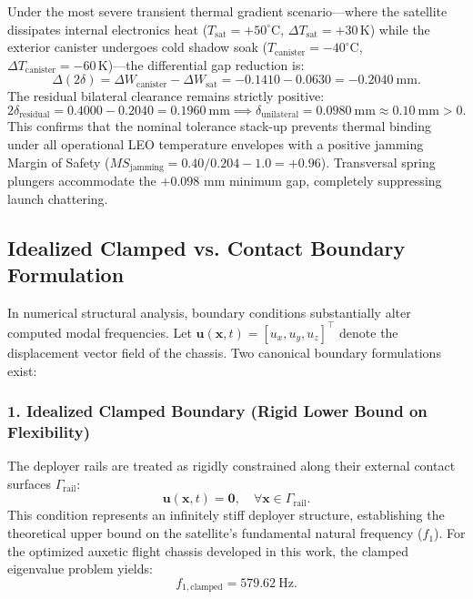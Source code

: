 Under the most severe transient thermal gradient scenario—where the satellite dissipates internal electronics heat ($T_{\text{sat}} = +50^\circ\text{C}$, $\Delta T_{\text{sat}} = +30\,\text{K}$) while the exterior canister undergoes cold shadow soak ($T_{\text{canister}} = -40^\circ\text{C}$, $\Delta T_{\text{canister}} = -60\,\text{K}$)—the differential gap reduction is:
\begin{equation}
\Delta (2\delta) = \Delta W_{\text{canister}} - \Delta W_{\text{sat}} = -0.1410 - 0.0630 = \SI{-0.2040}{\milli\meter}.
\label{eq:thermal_gap_reduction}
\end{equation}
The residual bilateral clearance remains strictly positive:
\begin{equation}
2\delta_{\text{residual}} = 0.4000 - 0.2040 = \SI{0.1960}{\milli\meter} \implies \delta_{\text{unilateral}} = \SI{0.0980}{\milli\meter} \approx \SI{0.10}{\milli\meter} > 0.
\label{eq:residual_gap}
\end{equation}
This confirms that the nominal tolerance stack-up prevents thermal binding under all operational LEO temperature envelopes with a positive jamming Margin of Safety ($MS_{\text{jamming}} = 0.40 / 0.204 - 1.0 = +0.96$). Transversal spring plungers accommodate the $+0.098\text{ mm}$ minimum gap, completely suppressing launch chattering.

\subsection{Idealized Clamped vs. Contact Boundary Formulation}

In numerical structural analysis, boundary conditions substantially alter computed modal frequencies. Let $\mathbf{u}(\mathbf{x}, t) = [u_x, u_y, u_z]^\top$ denote the displacement vector field of the chassis. Two canonical boundary formulations exist:

\subsubsection{1. Idealized Clamped Boundary (Rigid Lower Bound on Flexibility)}
The deployer rails are treated as rigidly constrained along their external contact surfaces $\Gamma_{\text{rail}}$:
\begin{equation}
\mathbf{u}(\mathbf{x}, t) = \mathbf{0}, \quad \forall \mathbf{x} \in \Gamma_{\text{rail}}.
\label{eq:clamped_bc}
\end{equation}
This condition represents an infinitely stiff deployer structure, establishing the theoretical upper bound on the satellite's fundamental natural frequency ($f_1$). For the optimized auxetic flight chassis developed in this work, the clamped eigenvalue problem yields:
\begin{equation}
f_{1,\text{clamped}} = \SI{579.62}{\hertz}.
\end{equation}

